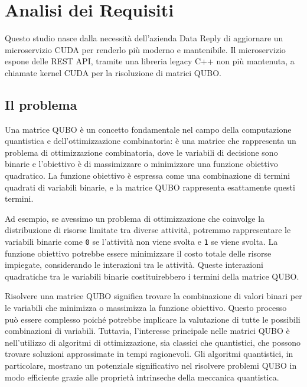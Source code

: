 \chapter{Analisi dei Requisiti}
\label{sec:requirements}


Questo studio nasce dalla necessità dell'azienda Data Reply di aggiornare un microservizio CUDA per renderlo più moderno e mantenibile. Il microservizio espone delle REST API, tramite una libreria legacy C++ non più mantenuta, a chiamate kernel CUDA per la risoluzione di matrici QUBO. 


\section{Il problema}

Una matrice QUBO è un concetto fondamentale nel campo della computazione quantistica e dell'ottimizzazione combinatoria: è una matrice che rappresenta un problema di ottimizzazione combinatoria, dove le variabili di decisione sono binarie e l'obiettivo è di massimizzare o minimizzare una funzione obiettivo quadratico. La funzione obiettivo è espressa come una combinazione di termini quadrati di variabili binarie, e la matrice QUBO rappresenta esattamente questi termini. 

Ad esempio, se avessimo un problema di ottimizzazione che coinvolge la distribuzione di risorse limitate tra diverse attività, potremmo rappresentare le variabili binarie come \verb|0| se l'attività non viene svolta e \verb|1| se viene svolta. La funzione obiettivo potrebbe essere minimizzare il costo totale delle risorse impiegate, considerando le interazioni tra le attività. Queste interazioni quadratiche tra le variabili binarie costituirebbero i termini della matrice QUBO. 

Risolvere una matrice QUBO significa trovare la combinazione di valori binari per le variabili che minimizza o massimizza la funzione obiettivo. Questo processo può essere complesso poiché potrebbe implicare la valutazione di tutte le possibili combinazioni di variabili. Tuttavia, l'interesse principale nelle matrici QUBO è nell'utilizzo di algoritmi di ottimizzazione, sia classici che quantistici, che possono trovare soluzioni approssimate in tempi ragionevoli. Gli algoritmi quantistici, in particolare, mostrano un potenziale significativo nel risolvere problemi QUBO in modo efficiente grazie alle proprietà intrinseche della meccanica quantistica.

